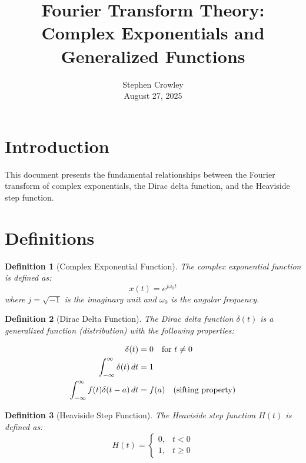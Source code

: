 \documentclass{article}
\newcommand{\tmaffiliation}[1]{\\ #1}
\newtheorem{definition}{Definition}
\begin{document}
\title{Fourier Transform Theory: Complex Exponentials and Generalized
Functions}

\author{
  Stephen Crowley
  \tmaffiliation{August 27, 2025}
}

\maketitle

\section{Introduction}

This document presents the fundamental relationships between the Fourier
transform of complex exponentials, the Dirac delta function, and the Heaviside
step function.

\section{Definitions}

\begin{definition}
  [Complex Exponential Function] The complex exponential function is defined
  as:
  \[ x (t) = e^{j \omega_0 t} \]
  where $j = \sqrt{- 1}$ is the imaginary unit and $\omega_0$ is the angular
  frequency.
\end{definition}

\begin{definition}
  [Dirac Delta Function] The Dirac delta function $\delta (t)$ is a
  generalized function (distribution) with the following properties:
  
  \begin{align}
    \delta (t) & = 0 \quad \text{for } t \neq 0 \\
    \int_{- \infty}^{\infty} \delta (t)  \hspace{0.17em} dt & = 1 \\
    \int_{- \infty}^{\infty} f (t) \delta (t - a)  \hspace{0.17em} dt & = f
    (a) \quad \text{(sifting property)} 
  \end{align}
\end{definition}

\begin{definition}
  [Heaviside Step Function] The Heaviside step function $H (t)$ is defined as:
  \[ H (t) = \left\{\begin{array}{ll}
       0, & t < 0\\
       1, & t \geq 0
     \end{array}\right. \]
\end{definition}
\end{document}
